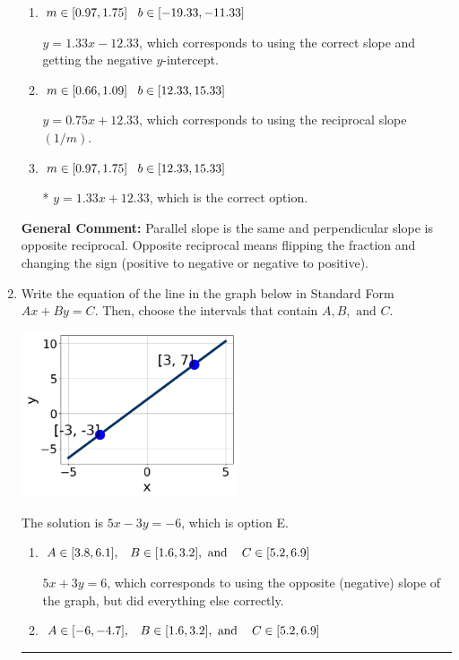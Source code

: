 \documentclass{extbook}[14pt]
\newcommand{\litem}[1]{\item #1

\rule{\textwidth}{0.4pt}}
\begin{document}
\begin{enumerate}
{\begin{enumerate}[label=\Alph*.]
 $y = -1.33x - 6.33$, which corresponds to using the negative slope.
\item \( m \in [0.97, 1.75] \hspace*{3mm} b \in [-19.33, -11.33] \)

 $y = 1.33x - 12.33$, which corresponds to using the correct slope and getting the negative $y$-intercept.
\item \( m \in [0.66, 1.09] \hspace*{3mm} b \in [12.33, 15.33] \)

 $y = 0.75x + 12.33$, which corresponds to using the reciprocal slope $(1/m)$.
\item \( m \in [0.97, 1.75] \hspace*{3mm} b \in [12.33, 15.33] \)

* $y = 1.33x + 12.33$, which is the correct option.
\end{enumerate}

\textbf{General Comment:} Parallel slope is the same and perpendicular slope is opposite reciprocal. Opposite reciprocal means flipping the fraction and changing the sign (positive to negative or negative to positive).
}
\litem{
Write the equation of the line in the graph below in Standard Form $Ax+By=C$. Then, choose the intervals that contain $A, B, \text{ and } C$.

\begin{center}
    \includegraphics[width=0.5\textwidth]{../Figures/linearGraphToStandardCopyB.png}
\end{center}


The solution is \( 5x - 3y = -6 \), which is option E.\begin{enumerate}[label=\Alph*.]
\item \( A \in [3.8, 6.1], \hspace{3mm} B \in [1.6, 3.2], \text{ and } \hspace{3mm} C \in [5.2, 6.9] \)

 $5x + 3y = 6$, which corresponds to using the opposite (negative) slope of the graph, but did everything else correctly.
\item \( A \in [-6, -4.7], \hspace{3mm} B \in [1.6, 3.2], \text{ and } \hspace{3mm} C \in [5.2, 6.9] \)


\end{enumerate}}
\end{enumerate}
\end{document}
